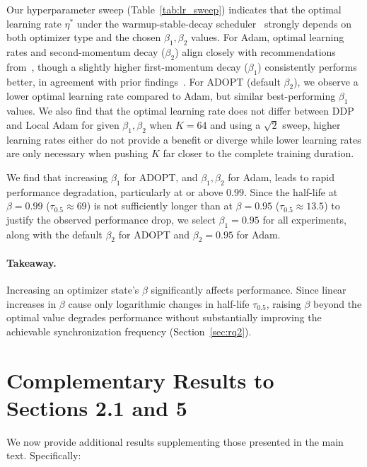 Our hyperparameter sweep (Table~\ref{tab:lr_sweep}) indicates that the optimal learning rate $\eta^*$ under the warmup-stable-decay scheduler~\citep{hagele2024scaling} strongly depends on both optimizer type and the chosen $\beta_1, \beta_2$ values. For Adam, optimal learning rates and second-momentum decay ($\beta_2$) align closely with recommendations from~\citet{allal2025smollm2}, though a slightly higher first-momentum decay ($\beta_1$) consistently performs better, in agreement with prior findings~\citep{zhang2025critical}. For ADOPT (default $\beta_2$), we observe a lower optimal learning rate compared to Adam, but similar best-performing $\beta_1$ values. We also find that the optimal learning rate does not differ between DDP and Local Adam for given $\beta_1, \beta_2$ when $K = 64$ and using a $\sqrt{2}$ sweep, higher learning rates either do not provide a benefit or diverge while lower learning rates are only necessary when pushing $K$ far closer to the complete training duration.

We find that increasing $\beta_1$ for ADOPT, and $\beta_1, \beta_2$ for Adam, leads to rapid performance degradation, particularly at or above $0.99$. Since the half-life at $\beta = 0.99$ ($\tau_{0.5} \approx 69$) is not sufficiently longer than at $\beta = 0.95$ ($\tau_{0.5} \approx 13.5$) to justify the observed performance drop, we select $\beta_1 = 0.95$ for all experiments, along with the default $\beta_2$ for ADOPT and $\beta_2 = 0.95$ for Adam.

\paragraph{Takeaway.} Increasing an optimizer state's $\beta$ significantly affects performance. Since linear increases in $\beta$ cause only logarithmic changes in half-life $\tau_{0.5}$, raising $\beta$ beyond the optimal value degrades performance without substantially improving the achievable synchronization frequency (Section~\ref{sec:rq2}).

\section{Complementary Results to Sections 2.1 and 5}
\label{sec:complementary}

We now provide additional results supplementing those presented in the main text. Specifically:


